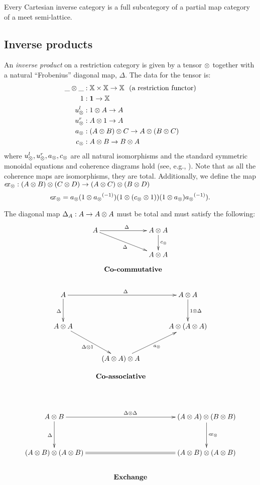 \begin{corollary}
  Every Cartesian inverse category is a full subcategory of a partial map category of a meet
  semi-lattice.
\end{corollary}



\subsection{Inverse products} %
\label{sub:inverse_products}


An \emph{inverse product} on a restriction category \X is given by a tensor $\otimes$ together with a
natural ``Frobenius'' diagonal map, $\Delta$. The data for the tensor is:
\begin{align*}
  \_ \otimes \_ &: \mathbb{X} \times \mathbb{X} \to \mathbb{X}\ \ \text{(a restriction functor)}\\
  1 &: \boldsymbol{1}\to \mathbb{X} \\
  u_{\otimes}^l &: 1 \otimes A \to A\\
  u_{\otimes}^r &: A \otimes 1 \to A\\
  a_{\otimes} &: (A \otimes B) \otimes C \to A \otimes (B \otimes C) \\
  c_{\otimes} &: A \otimes B \to B \otimes A
\end{align*}
where $u_{\otimes}^l, u_{\otimes}^r, a_{\otimes}, c_{\otimes}$ are all natural isomorphisms and the standard symmetric
monoidal equations and coherence diagrams hold (see, e.g.,
\cite{maclan97:categorieswrkmath}). Note that as all the coherence maps are isomorphisms,
they are total. Additionally, we define the map $e\!x_{\otimes}: (A\otimes B)\otimes(C\otimes D) \to (A\otimes C) \otimes (B\otimes D)$
\[
  e\!x_{\otimes} =  a_{\otimes}(1\otimes{a_{\otimes}}^{(-1)})(1\otimes(c_{\otimes}\otimes1))(1\otimes a_{\otimes}){a_{\otimes}}^{(-1)}).
\]

The diagonal map $\Delta_A:A \to A\otimes A$ must be total and must satisfy the following:
\[
  \xymatrix @!0 @C=90pt @R=35pt{
    A \ar[dr]_{\Delta} \ar[r]^{\Delta} &
    A \* A \ar[d]^{c_{\*}}\\
    & A \* A\\
    &*!<3pc,-15pt>{\text{\textbf{Co-commutative}}}
  }
\]
\[
  \xymatrix @C=30pt @R=30pt{
    A \ar[rr]^{\Delta} \ar[d]_{\Delta} & &
    A \* A \ar[d]^{1\*\Delta}\\
    A\*A \ar[dr]_{\Delta \* 1}& & A \* ( A \* A) \\
    &   (A \* A) \* A \ar[ur]_{a_{\*}}\\
    &*!<0pc,-35pt>{\text{\textbf{Co-associative}}}
  }
\]
\[
  \xymatrix @C=40pt @R=35pt{
    A \* B \ar[d]_{\Delta}
    \ar[rr]^{\Delta \* \Delta} & &
    (A \* A) \* (B \* B) \ar[d]^{\excs}\\
    (A \* B) \* (A \* B) \ar@{=}[rr] & &
    (A \* B) \* (A \* B)\\
    &*!<0pc,-25pt>{\text{\textbf{Exchange}}}
  }
\]

